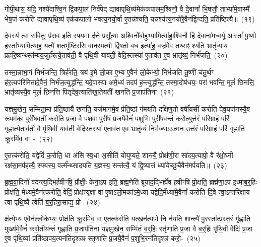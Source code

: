 गोपी॒थाय॒ यदि॒ नश्ये॑दाश्वि॒नं द्वि॑कपा॒लं निर्व॑पेद् द्यावा\-पृथि॒व्य॑मेक॑कपालम॒श्विनौ॒ वै दे॒वानां᳚ भि॒षजौ॒ ताभ्या॑मे॒वास्मै॑ भेष॒जं क॑रोति द्यावा\-पृथि॒व्य॑ एक॑कपालो भवत्य॒नयो॒र्वा ए॒तन्न॑श्यति॒ यन्नश्य॑त्य॒नयो॑रे॒वैन॑द्विन्दति॒ प्रति॑ष्ठित्यै॥~(१९)\ip

{\anuvakamend[{प्रा॒जा॒प॒त्यन्ते\-ऽक्षो\-ऽनु॑पाक्तो वे॒देना॒\-ऽभि वा॑सयति॒ तस्मा॒द्यज॑मानस्य॒ द्वात्रिꣳ॑शच्च}]}

दे॒वस्य॑ त्वा सवि॒तुः प्र॑स॒व इति॒ स्फ्यमा द॑त्ते॒ प्रसू᳚त्या अ॒श्विनो᳚र्बा॒हुभ्या॒मित्या॑हा॒श्विनौ॒ हि दे॒वाना॑मध्व॒र्यू आस्तां᳚ पू॒ष्णो हस्ता᳚भ्या॒मित्या॑ह॒ यत्यै॑ श॒तभृ॑ष्टिरसि वानस्प॒त्यो द्वि॑ष॒तो व॒ध इत्या॑ह॒ वज्र॑मे॒व तथ्सꣴ श्य॑ति॒ भ्रातृ॑व्याय प्रहरि॒ष्यन्थ्स्त॑म्बय॒जुर्\mbox{}ह॑रत्ये॒ताव॑ती॒ वै पृ॑थि॒वी याव॑ती॒ वेदि॒स्तस्या॑ ए॒ताव॑त ए॒व भ्रातृ॑व्यं॒ निर्भ॑जति॒~(२०)\ip

तस्मा॒न्नाभा॒गं निर्भ॑जन्ति॒ त्रिर्\mbox{}ह॑रति॒ त्रय॑ इ॒मे लो॒का ए॒भ्य ए॒वैनं॑ लो॒केभ्यो॒ निर्भ॑जति तू॒ष्णीं च॑तु॒र्थꣳ ह॑र॒त्यप॑रिमितादे॒वैनं॒ निर्भ॑ज॒त्युद्ध॑न्ति॒ यदे॒वास्या॑ अमे॒ध्यं तदप॑ ह॒न्त्युद्ध॑न्ति॒ तस्मा॒दोष॑धयः॒ परा॑ भवन्ति॒ मूलं॑ छिनत्ति॒ भ्रातृ॑व्यस्यै॒व मूलं॑ छिनत्ति पितृदेव॒त्याति॑खा॒तेय॑तीं खनति प्र॒जा\-प॑तिना~(२१)\ip

यज्ञमु॒खेन॒ सम्मि॑ता॒मा प्र॑ति॒ष्ठायै॑ खनति॒ यज॑मानमे॒व प्र॑ति॒ष्ठां ग॑मयति दक्षिण॒तो वर्\mbox{}षी॑यसीं करोति देव॒यज॑नस्यै॒व रू॒पम॑कः॒ पुरी॑षवतीं करोति प्र॒जा वै प॒शवः॒ पुरी॑षं प्र॒जयै॒वैनं॑ प॒शुभिः॒ पुरी॑षवन्तं करो॒त्युत्त॑रं परिग्रा॒हं परि॑ गृह्णात्ये॒ताव॑ती॒ वै पृ॑थि॒वी याव॑ती॒ वेदि॒स्तस्या॑ ए॒ताव॑त ए॒व भ्रातृ॑व्यं नि॒र्भज्या॒\-ऽऽ\-त्मन॒ उत्त॑रं परिग्रा॒हं परि॑ गृह्णाति क्रू॒रमि॑व॒ वा~-~(२२)\ip

ए॒तत्क॑रोति॒ यद्वेदिं॑ क॒रोति॒ धा अ॑सि स्व॒धा अ॒सीति॑ योयुप्यते॒ शान्त्यै॒ प्रोक्ष॑णी॒रा सा॑दय॒त्यापो॒ वै र॑क्षो॒घ्नी रक्ष॑सा॒मप॑हत्यै॒ स्फ्यस्य॒ वर्त्म᳚न्थ्सादयति य॒ज्ञस्य॒ सन्त॑त्यै॒ यं द्वि॒ष्यात्तं ध्या॑येच्छु॒चैवैन॑मर्पयति॥~(२३)\ip

{\anuvakamend[{भ॒ज॒ति॒ प्र॒जा\-प॑तिनेव॒ वै त्रय॑स्त्रिꣳशच्च}]}

ब्र॒ह्म॒वा॒दिनो॑ वदन्त्य॒द्भिर्\mbox{}ह॒वीꣳषि॒ प्रौक्षीः॒ केना॒\-ऽप इति॒ ब्रह्म॒णेति॑ ब्रूयाद॒द्भिर्\mbox{}ह्ये॑व ह॒वीꣳषि॑ प्रो॒क्षति॒ ब्रह्म॑णा॒\-ऽप इ॒ध्माब॒र्॒\mbox{}हिः प्रोक्ष॑ति॒ मेध्य॑मे॒वैन॑त्करोति॒ वेदिं॒ प्रोक्ष॑त्यृ॒क्षा वा ए॒षा\-ऽलो॒मका॑\-ऽमे॒ध्या यद्वेदि॒र्मेध्या॑मे॒वैनां᳚ करोति दि॒वे त्वा॒\-ऽ\-न्तरि॑क्षाय त्वा पृथि॒व्यै त्वेति॑ ब॒र्॒\mbox{}हिरा॒साद्य॒ प्रो-~(२४)\ip

क्ष॑त्ये॒भ्य ए॒वैन॑ल्लो॒केभ्यः॒ प्रोक्ष॑ति क्रू॒रमि॑व॒ वा ए॒तत्क॑रोति॒ यत्खन॑त्य॒पो नि न॑यति॒ शान्त्यै॑ पु॒रस्ता᳚त्प्रस्त॒रं गृ॑ह्णाति॒ मुख्य॑मे॒वैनं॑ करो॒तीय॑न्तं गृह्णाति प्र॒जा\-प॑तिना यज्ञमु॒खेन॒ सम्मि॑तं ब॒र्॒\mbox{}हिः स्तृ॑णाति प्र॒जा वै ब॒र्॒\mbox{}हिः पृ॑थि॒वी वेदिः॑ प्र॒जा ए॒व पृ॑थि॒व्यां प्रति॑\-ष्ठा\-पय॒त्यन॑ति\-दृश्ञꣴ स्तृणाति प्र॒जयै॒वैनं॑ प॒शुभि॒रन॑तिदृश्ञं करो॒-~(२५)\ip

